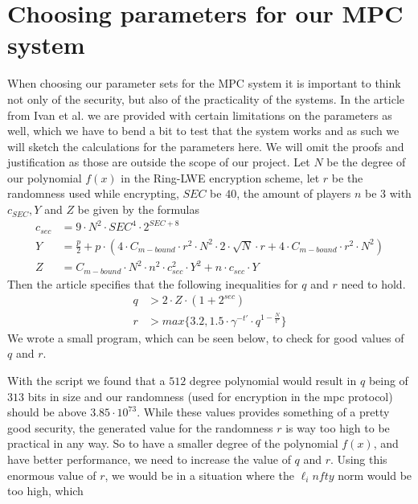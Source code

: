 \documentclass[../main.tex]{subfiles}
\begin{document}
\section{Choosing parameters for our MPC system} \label{sec:choosing-parameters}
    When choosing our parameter sets for the MPC system it is important to think not only of the security, but also of
    the practicality of the systems.
    In the article \cite{damgaard2012multiparty} from Ivan et al. we are provided with certain limitations on the parameters as well, which we have to bend a bit to test that the system works and as such we will sketch the calculations for the parameters here.
    We will omit the proofs and justification as those are outside the scope of our project.
    Let $N$ be the degree of our polynomial $f(x)$ in the Ring-LWE encryption scheme, %
    let $r$ be the randomness used while encrypting, $SEC$ be $40$, the amount of players $n$ be 3 with $c_{SEC}, Y$ and $Z$
    be given by the formulas
    \begin{align*}
        c_{sec} &= 9 \cdot N^2 \cdot SEC^4 \cdot 2^{SEC + 8} \\
        Y       &= \frac{p}{2} + p \cdot (4 \cdot C_{m-bound} \cdot r^2 \cdot N^2 \cdot 2 \cdot \sqrt{N} \cdot r + 4 \cdot C_{m-bound} \cdot r^2 \cdot N^2) \\
        Z       &= C_{m-bound} \cdot N^2 \cdot n^2 \cdot c_{sec}^2 \cdot Y^2 + n \cdot c_{sec} \cdot Y
    \end{align*}
    Then the article specifies that the following inequalities for $q$ and $r$ need to hold.
    \begin{align*}
        q   &> 2 \cdot Z \cdot (1 + 2^{sec}) \\
        r   &> max\{3.2, 1.5 \cdot \gamma^{-t'} \cdot q^{1 - \frac{N}{t'}}\}
    \end{align*}
    We wrote a small program, which can be seen below, to check for good values of $q$ and $r$.
    
	With the script we found that a $512$ degree polynomial would result in $q$ being of $313$ bits in size and our randomness (used for encryption in the mpc protocol) should be above $3.85 \cdot 10^{73}$.
	While these values provides something of a pretty good security, the generated value for the randomness $r$ is way too high to be
	practical in any way.
	So to have a smaller degree of the polynomial $f(x)$, and have better performance,
	we need to increase the value of $q$ and $r$.
	Using this enormous value of $r$, we would be in a situation where the $\ell_infty$ norm would be too high, which
\end{document}
